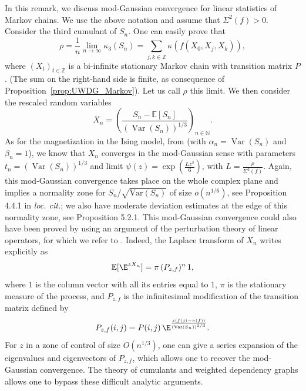 \documentclass[envcountsame]{svmult}
\newcommand{\N}{\mathbb{N}}
\newcommand{\Z}{\mathbb{Z}}
\newcommand{\esper}{\mathbb{E}}
\newcommand{\var}{\mathrm{Var}}
\DeclareMathOperator{\Var}{Var}
\begin{document}
\begin{remark}
  In this remark, we discuss mod-Gaussian convergence for linear statistics of Markov chains.
  We use the above notation and assume that $\varSigma^2(f)>0$.
  Consider the third cumulant of $S_n$. One can easily prove that
  \[\rho= \frac{1}{n} \lim_{n \to \infty} \kappa_3(S_n) = \sum_{j,k \in \Z} \kappa(f(X_0,X_j,X_k)),\]
  where $(X_t)_{t \in \Z}$ is a bi-infinite stationary Markov chain with transition matrix $P$.
  (The sum on the right-hand side is finite, as consequence of Proposition~\ref{prop:UWDG_Markov}).
  Let us call $\rho$ this limit. We then consider the rescaled random variables
  $$X_n=\left(\frac{S_n- \esper[S_n]}{(\Var(S_n))^{1/3}}\right)_{n\in \N}.$$ 
As for the magnetization in the Ising model,
from \cite[Section 5]{FMN16} (with $\alpha_n=\Var(S_n)$ and $\beta_n=1$),
we know that $X_n$ converges in the mod-Gaussian sense
with parameters $t_n=(\Var(S_n))^{1/3}$ and limit $\psi(z)=\exp(\frac{L z^3}{6})$, with $L=\tfrac{\rho}{\varSigma^3(f)}$.
Again, this mod-Gaussian convergence takes place on the whole complex plane
and implies a normality zone for $S_n/\sqrt{\var(S_n)}$ of size $o(n^{1/6})$, see Proposition 4.4.1 in \emph{loc. cit.};
we also have moderate deviation estimates at the edge of this normality zone, see Proposition 5.2.1. This mod-Gaussian convergence could also have been proved by using an argument of the perturbation theory of linear operators, for which we refer to \cite{Kato80}. Indeed, the Laplace transform of $X_n$ writes explicitly as
$$\esper[\E^{zX_n}] = \pi\,(P_{z,f})^n\,1,$$
where $1$ is the column vector with all its entries equal to $1$, $\pi$ is the stationary measure of the process, and $P_{z,f}$ is the infinitesimal modification of the transition matrix defined by
$$P_{z,f}(i,j) = P(i,j)\,\E^{\frac{z (f(j)-\pi(f))}{(\var (S_n))^{1/3}}}.$$
For $z$ in a zone of control of size $O(n^{1/3})$, one can give a series expansion of the eigenvalues and eigenvectors of $P_{z,f}$, which allows one to recover the mod-Gaussian convergence. The theory of cumulants and weighted dependency graphs allows one to bypass these difficult analytic arguments.
\end{remark}









\end{document}
